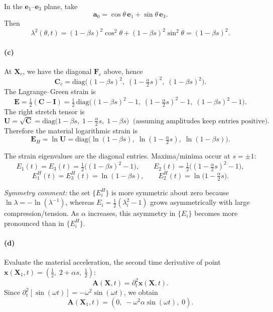 \medskip
In the $\bm{e}_1$--$\bm{e}_3$ plane, take
$$
\bm{a}_0=\cos\theta\,\bm{e}_1+\sin\theta\,\bm{e}_3.
$$
Then
$$
\lambda^2(\theta,t)=(1-\beta s)^2\cos^2\theta+(1-\beta s)^2\sin^2\theta=(1-\beta s)^2.
$$

\bigskip
\paragraph{(c)}
At $\bm{X}_c$, we have the diagonal $\bm{F}_c$ above, hence
$$
\bm{C}_c=\mathrm{diag}\!\Big((1-\beta s)^2,\; (1-\tfrac{\alpha}{2}s)^2,\; (1-\beta s)^2\Big).
$$
The Lagrange–Green strain is
$$
\bm{E}=\tfrac{1}{2}(\bm{C}-\bm{I})
=\tfrac{1}{2}\,\mathrm{diag}\!\Big((1-\beta s)^2-1,\; (1-\tfrac{\alpha}{2}s)^2-1,\; (1-\beta s)^2-1\Big).
$$
The right stretch tensor is
$$
\bm{U}=\sqrt{\bm{C}}=\mathrm{diag}\!\Big(1-\beta s,\; 1-\tfrac{\alpha}{2}s,\; 1-\beta s\Big)
\;\; \text{(assuming amplitudes keep entries positive)}.
$$
Therefore the material logarithmic strain is
$$
\bm{E}_H=\ln\bm{U}
=\mathrm{diag}\!\Big(\ln(1-\beta s),\; \ln(1-\tfrac{\alpha}{2}s),\; \ln(1-\beta s)\Big).
$$

The strain eigenvalues are the diagonal entries. Maxima/minima occur at $s=\pm 1$:
$$
E_1(t)=E_3(t)=\tfrac{1}{2}\big((1-\beta s)^2-1\big),\qquad
E_2(t)=\tfrac{1}{2}\big((1-\tfrac{\alpha}{2}s)^2-1\big),
$$
$$
E_1^H(t)=E_3^H(t)=\ln(1-\beta s),\qquad
E_2^H(t)=\ln\!\big(1-\tfrac{\alpha}{2}s\big).
$$

\emph{Symmetry comment:} the set $\{E_i^H\}$ is more symmetric about zero because $\ln\lambda=-\ln(\lambda^{-1})$, whereas $E_i=\tfrac{1}{2}(\lambda_i^2-1)$ grows asymmetrically with large compression/tension. As $\alpha$ increases, this asymmetry in $\{E_i\}$ becomes more pronounced than in $\{E_i^H\}$.

\bigskip
\paragraph{(d)}
Evaluate the material acceleration, the second time derivative of point $\bm{x}(\bm{X}_1,t)=(\tfrac{1}{2},\;2+\alpha s,\;\tfrac{1}{2})$:
$$
\bm{A}(\bm{X},t)=\partial_t^2 \bm{x}(\bm{X},t).
$$
Since $\partial_t^2[\sin(\omega t)]=-\omega^2\sin(\omega t)$, we obtain
$$
\bm{A}(\bm{X}_1,t)=(0,\;-\omega^2\alpha\sin(\omega t),\;0).
$$
